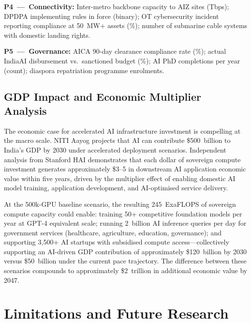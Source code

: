 \documentclass[conference]{IEEEtran}
\begin{document}
\noindent\textbf{P4~---~Connectivity:} Inter-metro backbone capacity to AIZ sites (Tbps); DPDPA implementing rules in force (binary); OT cybersecurity incident reporting compliance at 50~MW+ assets (\%); number of submarine cable systems with domestic landing rights.

\noindent\textbf{P5~---~Governance:} AICA 90-day clearance compliance rate (\%); actual IndiaAI disbursement vs.\ sanctioned budget (\%); AI PhD completions per year (count); diaspora repatriation programme enrolments.

\subsection{GDP Impact and Economic Multiplier Analysis}

The economic case for accelerated AI infrastructure investment is compelling at the macro scale. NITI Aayog projects that AI can contribute \$500~billion to India's GDP by 2030 under accelerated deployment scenarios. Independent analysis from Stanford HAI \cite{hai2025aiindex} demonstrates that each dollar of sovereign compute investment generates approximately \$3--5 in downstream AI application economic value within five years, driven by the multiplier effect of enabling domestic AI model training, application development, and AI-optimised service delivery.

At the 500k-GPU baseline scenario, the resulting 245~ExaFLOPS of sovereign compute capacity could enable: training 50+ competitive foundation models per year at GPT-4 equivalent scale; running 2~billion AI inference queries per day for government services (healthcare, agriculture, education, governance); and supporting 3{,}500+ AI startups with subsidised compute access---collectively supporting an AI-driven GDP contribution of approximately \$120~billion by 2030 versus \$50~billion under the current pace trajectory. The difference between these scenarios compounds to approximately \$2~trillion in additional economic value by 2047.

\section{Limitations and Future Research}
\end{document}
